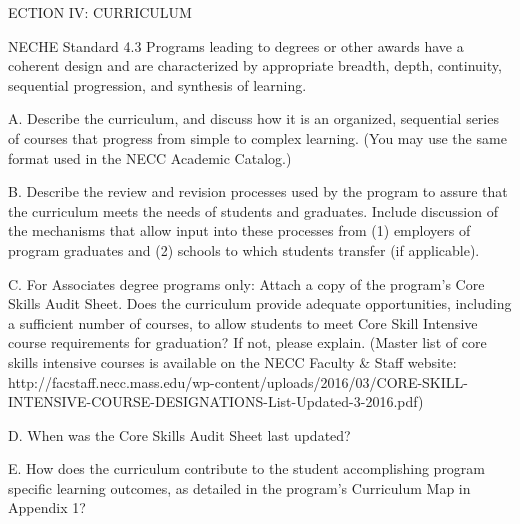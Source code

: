 ECTION IV: CURRICULUM

NECHE Standard 4.3 Programs leading to degrees or other awards have a coherent design and are characterized by appropriate breadth, depth, continuity, sequential progression, and synthesis of learning.


A. Describe the curriculum, and discuss how it is an organized, sequential series of courses that progress from simple to complex learning. (You may use the same format used in the NECC Academic Catalog.)





B. Describe the review and revision processes used by the program to assure that the curriculum meets the needs of students and graduates. Include discussion of the mechanisms that allow input into these processes from (1) employers of program graduates and (2) schools to which students transfer (if applicable).



C. For Associates degree programs only: Attach a copy of the program’s Core Skills Audit Sheet.  Does the curriculum provide adequate opportunities, including a sufficient number of courses, to allow students to meet Core Skill Intensive course requirements for graduation? If not, please explain.  (Master list of core skills intensive courses is available on the NECC Faculty & Staff website: http://facstaff.necc.mass.edu/wp-content/uploads/2016/03/CORE-SKILL-INTENSIVE-COURSE-DESIGNATIONS-List-Updated-3-2016.pdf)





D. When was the Core Skills Audit Sheet last updated?





E. How does the curriculum contribute to the student accomplishing program specific learning outcomes, as detailed in the program’s Curriculum Map in Appendix 1? 